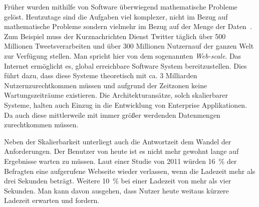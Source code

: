 Früher wurden mithilfe von Software überwiegend mathematische Probleme gelöst. Heutzutage sind die Aufgaben viel komplexer, nicht im Bezug auf mathematische Probleme sondern vielmehr im Bezug auf der Menge der Daten~\cite[S.~18]{kuhn_reactive_2015}. Zum Beispiel muss der Kurznachrichten Dienst Twitter täglich über 500 Millionen Tweets\footnotemark[1] verarbeiten und über 300 Millionen Nutzern\footnotemark[2] auf der ganzen Welt zur Verfügung stellen. Man spricht hier von dem sogenannten \textit{Web-scale}. Das Internet ermöglicht es, global erreichbare Software System bereitzustellen. Dies führt dazu, dass diese Systeme theoretisch mit ca. 3 Milliarden Nutzern\footnotemark[3] zurechtkommen müssen und aufgrund der Zeitzonen keine Wartungszeiträume existieren. Die Architekturansätze, solch skalierbarer Systeme, halten auch Einzug in die Entwicklung von Enterprise Applikationen. Da auch diese mittlerweile mit immer größer werdenden Datenmengen zurechtkommen müssen.


\pagebreak

Neben der Skalierbarkeit unterliegt auch die Antwortzeit dem Wandel der Anforderungen. Der Benutzer von heute ist es nicht mehr gewohnt lange auf Ergebnisse warten zu müssen. Laut einer Studie von 2011 würden 16~\% der Befragten eine aufgerufene Webseite wieder verlassen, wenn die Ladezeit mehr als drei Sekunden beträgt. Weitere 10~\% bei einer Ladezeit von mehr als vier Sekunden\footnotemark[4]. Man kann davon ausgehen, dass Nutzer heute weitaus kürzere Ladezeit erwarten und fordern.\\



